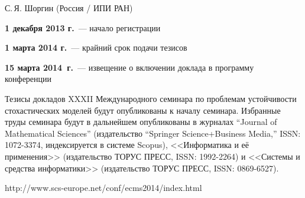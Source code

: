 С.\,Я. Шоргин (Россия / ИПИ РАН)

\vspace*{12pt}

   \thispagestyle{empty}


{\centerline{}}

\vspace*{5pt}

\textbf{1 декабря 2013 г.}~--- начало регистрации

\textbf{1 марта 2014 г.}~--- крайний срок подачи тезисов

\textbf{15 марта 2014~г.}~--- извещение о включении доклада в программу конференции 

\vspace*{11pt}

{\centerline{}}

\vspace*{5pt}

Тезисы докладов XXXII Международного семинара по проблемам устойчивости стохастических 
моделей будут опубликованы к началу семинара.  Избранные труды семинара будут в 
дальнейшем опубликованы в журналах ``Journal of Mathematical Sciences'' (издательство 
``Springer 
Science+Business Media,'' ISSN: 1072-3374, индексируется в системе Scopus), <<Информатика и её 
применения>> (издательство ТОРУС ПРЕСС, ISSN: 1992-2264) и <<Системы и средства информатики>> (издательство ТОРУС 
ПРЕСС, ISSN: 0869-6527).



 
 
 
 
 

\newpage
 
\hfill {\large{\sf http://www.scs-europe.net/conf/ecms2014/index.html}}


\vspace*{3mm}
   


